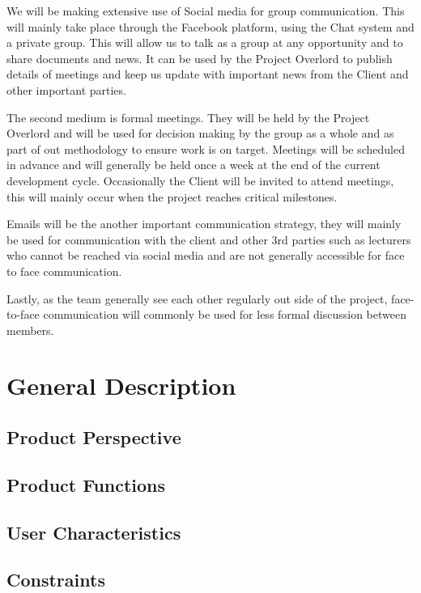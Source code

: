 \documentclass[11pt,a4paper]{article}
\begin{document}
We will be making extensive use of Social media for group communication. This will mainly take place through the Facebook platform, using the Chat system and a private group. This will allow us to talk as a group at any opportunity and to share documents and news. It can be used by the Project Overlord to publish details of meetings and keep us update with important news from the Client and other important parties. 

The second medium is formal meetings. They will be held by the Project Overlord and will be used for decision making by the group as a whole and as part of out methodology to ensure work is on target. Meetings will be scheduled in advance and will generally be held once a week at the end of the current development cycle. Occasionally the Client will be invited to attend meetings, this will mainly occur when the project reaches critical milestones. 

Emails will be the another important communication strategy, they will mainly be used for communication with the client and other 3rd parties such as lecturers who cannot be reached via social media and are not generally accessible for face to face communication. 

Lastly, as the team generally see each other regularly out side of the project, face-to-face communication will commonly be used for less formal discussion between members. 

\section{General Description}
\label{sec:gen-desc}

\subsection{Product Perspective}
\label{sec:product-perspective}
\subsection{Product Functions}
\label{sec:product-functions}
\subsection{User Characteristics}
\label{sec:user-characteristics}
\subsection{Constraints}
\label{sec:constraints}
\end{document}
